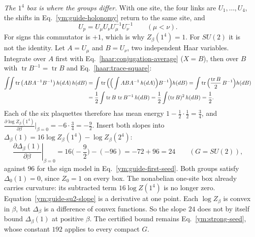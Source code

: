\emph{The $1^4$ box is where the groups differ.} With one site, the four
links are $U_1,\dots,U_4$, the shifts in Eq.~\eqref{ym:guide-holonomy} return
to the same site, and
\begin{equation}\label{ym:guide-one-site-plaquette}
 U_p=U_\mu U_\nu U_\mu^{-1}U_\nu^{-1}\qquad(\mu<\nu).
\end{equation}
For signs this commutator is $+1$, which is why $Z_\beta(1^4)=1$. For $SU(2)$
it is not the identity. Let $A=U_\mu$ and $B=U_\nu$, two independent Haar
variables. Integrate over $A$ first with Eq.~\eqref{haar:conjugation-average}
($X=B$), then over $B$ with $\operatorname{tr}B^{-1}=\operatorname{tr}B$ and
Eq.~\eqref{haar:trace-square}:
\begin{align}
 \int\!\!\int\operatorname{tr}\big(ABA^{-1}B^{-1}\big)\,h(dA)\,h(dB)
 &=\int\operatorname{tr}\Big(\Big(\int ABA^{-1}\,h(dA)\Big)B^{-1}\Big)h(dB)
 =\int\operatorname{tr}\Big(\frac{\operatorname{tr}B}{2}\,B^{-1}\Big)h(dB)\notag\\
 &=\frac12\int\operatorname{tr}B\,\operatorname{tr}B^{-1}\,h(dB)
 =\frac12\int(\operatorname{tr}B)^2\,h(dB)=\frac12 .
 \label{ym:guide-commutator-mean}
\end{align}
Each of the six plaquettes therefore has mean energy
$1-\frac12\cdot\frac12=\frac34$, and
$\frac{\partial\log Z_\beta(1^4)}{\partial\beta}\big|_{\beta=0}
=-6\cdot\frac34=-\frac92$. Insert both slopes into
$\Delta_\beta(1)=16\log Z_\beta(1^4)-\log Z_\beta(2^4)$:
\begin{equation}\label{ym:guide-su2-slope}
 \left.\frac{\partial\Delta_\beta(1)}{\partial\beta}\right|_{\beta=0}
 =16\Big(-\frac92\Big)-(-96)=-72+96=24
 \qquad(G=SU(2)),
\end{equation}
against $96$ for the sign model in Eq.~\eqref{ym:guide-first-seed}. Both
groups satisfy $\Delta_0(1)=0$, since $Z_0=1$ on every box. The nonabelian
one-site box already carries curvature: its subtracted term $16\log Z(1^4)$
is no longer zero. Equation~\eqref{ym:guide-su2-slope} is a derivative at
one point. Each $\log Z_\beta$ is convex in $\beta$, but $\Delta_\beta$
is a difference of convex functions. So the slope $24$ does not by itself
bound $\Delta_\beta(1)$ at positive $\beta$. The certified bound remains
Eq.~\eqref{ym:strong-seed}, whose constant $192$ applies to every compact
$G$.

